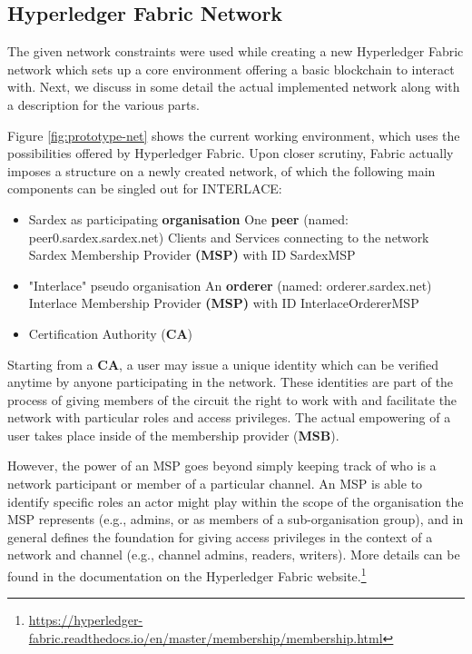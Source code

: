 \subsection{Hyperledger Fabric Network}

The given network constraints were used while creating a new Hyperledger Fabric network which sets up a core environment offering a basic blockchain to interact with. Next, we discuss in some detail the actual implemented network along with a description for the various parts.

Figure \ref{fig:prototype-net} shows the current working environment, which uses the possibilities offered by Hyperledger Fabric. Upon closer scrutiny, Fabric actually imposes a structure on a newly created network, of which the following main components can be singled out for INTERLACE:

\begin{itemize}
	\item Sardex as participating \textbf{organisation}
		\subitem One  \textbf{peer} (named: peer0.sardex.sardex.net)
		\subitem Clients and Services connecting to the network
		\subitem Sardex Membership Provider \textbf{(MSP)} with ID SardexMSP
	\item "Interlace" pseudo organisation
		\subitem An \textbf{orderer} (named: orderer.sardex.net)
		\subitem Interlace Membership Provider \textbf{(MSP)} with ID InterlaceOrdererMSP
	\item Certification Authority (\textbf{CA})
\end{itemize}

Starting from a \textbf{CA}, a user may issue a unique identity which can be verified anytime by anyone participating in the network. These identities are part of the process of giving members of the circuit the right to work with and facilitate the network with particular roles and access privileges. The actual empowering of a user takes place inside of the membership provider (\textbf{MSB}).

However, the power of an MSP goes beyond simply keeping track of who is a network participant or member of a particular channel. An MSP is able to identify specific roles an actor might play  within the scope of the organisation the MSP represents (e.g., admins, or as members of a sub-organisation group), and in general defines the foundation for giving access privileges in the context of a network and channel (e.g., channel admins, readers, writers). More details can be found in the documentation on the Hyperledger Fabric website.\footnote{\url{https://hyperledger-fabric.readthedocs.io/en/master/membership/membership.html}}


